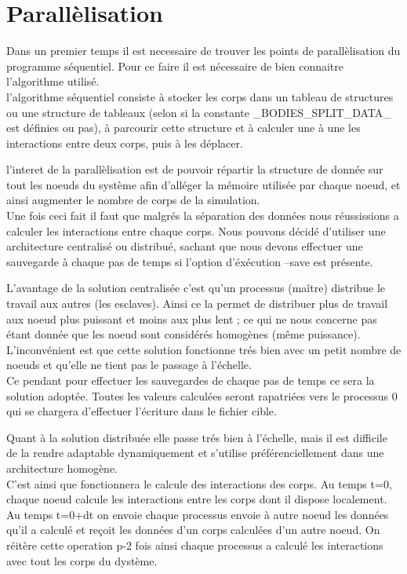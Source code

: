 \section{Parallèlisation}
\par Dans un premier temps il est necessaire de trouver les points de parallèlisation 
du programme séquentiel. Pour ce faire il est nécessaire de bien connaitre l'algorithme 
utilisé.\\
l'algorithme séquentiel consiste à stocker les corps dans un tableau de structures ou une structure 
de tableaux (selon si la constante \_BODIES\_SPLIT\_DATA\_ est définies ou pas), à parcourir 
cette structure et à calculer une à une les interactions entre deux corps, puis à les déplacer.\\
\par l'interet de la parallèlisation est de pouvoir répartir la structure de donnée sur tout les
noeuds du système afin d'alléger la mémoire utilisée par chaque noeud, et ainsi augmenter le 
nombre de corps de la simulation.\\
Une fois ceci fait il faut que malgrés la séparation des données nous réussissions a calculer
les interactions entre chaque corps. Nous pouvons décidé d'utiliser une architecture centralisé 
ou distribué, sachant que nous devons effectuer une sauvegarde à chaque pas de temps si l'option 
d'éxécution --save est présente.\\
\par L'avantage de la solution centralisée c'est qu'un processus (maître) distribue le travail aux autres
(les esclaves). Ainsi ce la permet de distribuer plus de travail aux noeud plus puissant et moins aux
plus lent ; ce qui ne nous concerne pas étant donnée que les noeud sont considérés homogènes
(même puissance).\\
L'inconvénient est que cette solution fonctionne trés bien avec un petit nombre de noeuds et qu'elle 
ne tient pas le passage à l'échelle.\\
Ce pendant pour effectuer les sauvegardes de chaque pas de temps ce sera la solution adoptée. 
Toutes les valeurs calculées seront rapatriées vers le processus 0 qui se chargera d'effectuer 
l'écriture  dans le fichier cible.\\
\par Quant à la solution distribuée elle passe trés bien à l'échelle, mais il est difficile de
la rendre adaptable dynamiquement et s'utilise préférenciellement dans une architecture homogène.
\\C'est ainsi que fonctionnera le calcule des interactions des corps. Au temps t=0, chaque noeud 
calcule les interactions entre les corps dont il dispose localement. Au temps t=0+dt on envoie chaque
processus envoie à autre noeud les données qu'il a calculé et reçoit les données d'un corps
calculées d'un autre noeud. On réitère cette operation p-2 fois ainsi chaque processus a
calculé les interactions avec tout les corps du dystème.\\

